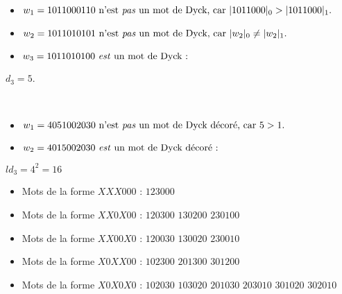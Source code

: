 \begin{example}[Définition 3 : $n = 5$]
    ~
    \begin{itemize}
        \item $w_1 = 1011000110 \text{ n'est \emph{pas} un mot de Dyck,
        car } |1011000|_0 > |1011000|_1.$
        \item $w_2 = 1011010101 \text{ n'est \emph{pas} un mot de Dyck,
        car } |w_2|_0 \neq |w_2|_1.$
        \item $w_3 = 1011010100 \text{ \emph{est} un mot de Dyck : }$
    \end{itemize}
    
\end{example}

\begin{example}[Théorème 3 : $n = 3$]
    $d_3 = 5$.
    \begin{center}
        
    \end{center}
\end{example}

\begin{example}[Définition 4 : $n = 5$]
    ~
    \begin{itemize}
        \item $w_1 = 4051002030 \text{ n'est \emph{pas} un mot de Dyck
            décoré, car } 5 > 1.$
        \item $w_2 = 4015002030 \text{ \emph{est} un mot de Dyck décoré :}$
    \end{itemize}
    
\end{example}

\begin{example}[Théorème 4 : $n = 3$]
    $ld_3 = 4^2 = 16$
    \begin{itemize}
        \item Mots de la forme $XXX000$ :
            \subitem $123000$
        \item Mots de la forme $XX0X00$ :
            \subitem $120300$
            \hspace{2cm} $130200$
            \hspace{2cm} $230100$
        \item Mots de la forme $XX00X0$ :
            \subitem $120030$
            \hspace{2cm} $130020$
            \hspace{2cm} $230010$
        \item Mots de la forme $X0XX00$ :
            \subitem $102300$
            \hspace{2cm} $201300$
            \hspace{2cm} $301200$
        \item Mots de la forme $X0X0X0$ :
            \subitem $102030$
            \hspace{2cm} $103020$
            \hspace{2cm} $201030$
            \subitem $203010$
            \hspace{2cm} $301020$
            \hspace{2cm} $302010$
    \end{itemize}
    
\end{example}